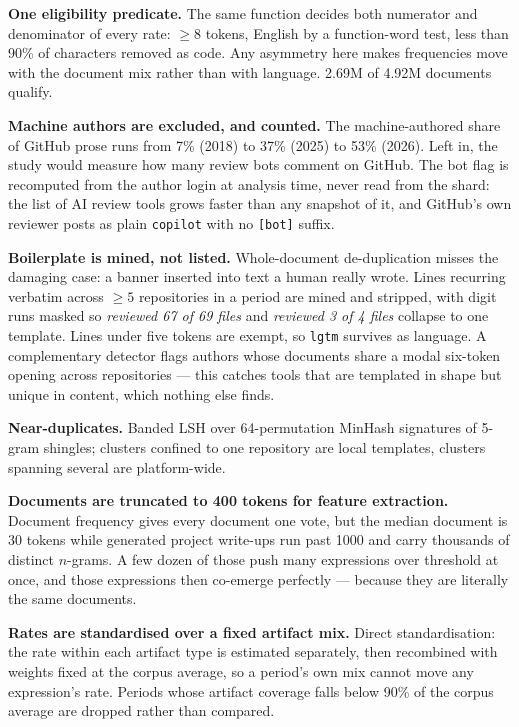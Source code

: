 \documentclass[11pt,a4paper]{article}
\newcommand{\expr}[1]{\texttt{\small #1}}
\begin{document}
\textbf{One eligibility predicate.} The same function decides both numerator and
denominator of every rate: $\geq 8$ tokens, English by a function-word test, less than
90\% of characters removed as code. Any asymmetry here makes frequencies move with
the document mix rather than with language. 2.69M of 4.92M documents qualify.

\textbf{Machine authors are excluded, and counted.} The machine-authored share of
GitHub prose runs from 7\% (2018) to 37\% (2025) to 53\% (2026). Left in, the study
would measure how many review bots comment on GitHub. The bot flag is recomputed from
the author login at analysis time, never read from the shard: the list of AI review
tools grows faster than any snapshot of it, and GitHub's own reviewer posts as plain
\expr{copilot} with no \expr{[bot]} suffix.

\textbf{Boilerplate is mined, not listed.} Whole-document de-duplication misses the
damaging case: a banner inserted into text a human really wrote. Lines recurring
verbatim across $\geq 5$ repositories in a period are mined and stripped, with digit
runs masked so \emph{reviewed 67 of 69 files} and \emph{reviewed 3 of 4 files} collapse
to one template. Lines under five tokens are exempt, so \expr{lgtm} survives as
language. A complementary detector flags authors whose documents share a modal
six-token opening across repositories --- this catches tools that are templated in
shape but unique in content, which nothing else finds.

\textbf{Near-duplicates.} Banded LSH over 64-permutation MinHash signatures of
5-gram shingles; clusters confined to one repository are local templates, clusters
spanning several are platform-wide.

\textbf{Documents are truncated to 400 tokens for feature extraction.} Document
frequency gives every document one vote, but the median document is 30 tokens while
generated project write-ups run past 1000 and carry thousands of distinct
$n$-grams. A few dozen of those push many expressions over threshold at once, and
those expressions then co-emerge perfectly --- because they are literally the same
documents.

\textbf{Rates are standardised over a fixed artifact mix.} Direct standardisation:
the rate within each artifact type is estimated separately, then recombined with
weights fixed at the corpus average, so a period's own mix cannot move any
expression's rate. Periods whose artifact coverage falls below 90\% of the corpus
average are dropped rather than compared.
\end{document}
